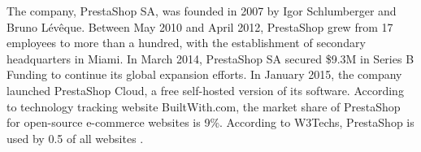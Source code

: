 The company, PrestaShop SA, was founded in 2007 by Igor Schlumberger and Bruno Lévêque. Between May 2010 and April 2012, PrestaShop grew from 17 employees to more than a hundred, with the establishment of secondary headquarters in Miami. In March 2014, PrestaShop SA secured \$9.3M in Series B Funding to continue its global expansion efforts. In January 2015, the company launched PrestaShop Cloud, a free self-hosted version of its software. According to technology tracking website BuiltWith.com, the market share of PrestaShop for open-source e-commerce websites is 9\%. According to W3Techs, PrestaShop is used by 0.5 of all websites \cite{prestashop_history}.